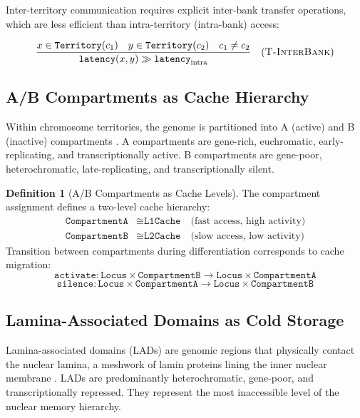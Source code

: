 \documentclass[12pt,a4paper]{article}
\theoremstyle{plain}
\theoremstyle{definition}
\newtheorem{definition}[theorem]{Definition}
\begin{document}
Inter-territory communication requires explicit inter-bank transfer operations, which are less efficient than intra-territory (intra-bank) access:

\[
\frac{x \in \texttt{Territory}(c_1) \quad y \in \texttt{Territory}(c_2) \quad c_1 \neq c_2}{\texttt{latency}(x, y) \gg \texttt{latency}_{\text{intra}}}
\quad (\textsc{T-InterBank})
\]

\subsection{A/B Compartments as Cache Hierarchy}

Within chromosome territories, the genome is partitioned into A (active) and B (inactive) compartments \cite{lieberman2009comprehensive}. A compartments are gene-rich, euchromatic, early-replicating, and transcriptionally active. B compartments are gene-poor, heterochromatic, late-replicating, and transcriptionally silent.

\begin{definition}[A/B Compartments as Cache Levels]\label{def:compartments}
The compartment assignment defines a two-level cache hierarchy:
\begin{align*}
  \texttt{CompartmentA} &\cong \texttt{L1Cache} \quad \text{(fast access, high activity)} \\
  \texttt{CompartmentB} &\cong \texttt{L2Cache} \quad \text{(slow access, low activity)}
\end{align*}
Transition between compartments during differentiation corresponds to cache migration:
\[
  \texttt{activate} : \texttt{Locus} \times \texttt{CompartmentB} \to \texttt{Locus} \times \texttt{CompartmentA}
\]
\[
  \texttt{silence} : \texttt{Locus} \times \texttt{CompartmentA} \to \texttt{Locus} \times \texttt{CompartmentB}
\]
\end{definition}

\subsection{Lamina-Associated Domains as Cold Storage}

Lamina-associated domains (LADs) are genomic regions that physically contact the nuclear lamina, a meshwork of lamin proteins lining the inner nuclear membrane \cite{guelen2008domain}. LADs are predominantly heterochromatic, gene-poor, and transcriptionally repressed. They represent the most inaccessible level of the nuclear memory hierarchy.
\end{document}
